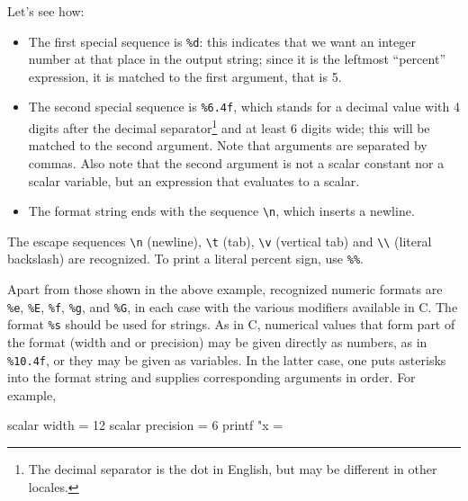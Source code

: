 Let's see how:
\begin{itemize}
\item The first special sequence is \verb|%d|: this indicates that we
  want an integer number at that place in the output string; since it
  is the leftmost ``percent'' expression, it is matched to the first
  argument, that is 5.
\item The second special sequence is \verb|%6.4f|, which stands for a
  decimal value with 4 digits after the decimal separator\footnote{The
    decimal separator is the dot in English, but may be different in
    other locales.} and at least 6 digits wide; this will be matched
  to the second argument. Note that arguments are separated by
  commas. Also note that the second argument is not a scalar constant
  nor a scalar variable, but an expression that evaluates to a scalar.
\item The format string ends with the sequence \verb|\n|, which
  inserts a newline.
\end{itemize}

The escape sequences \verb|\n| (newline), \verb|\t| (tab), \verb|\v|
(vertical tab) and \verb|\\| (literal backslash) are recognized. To
print a literal percent sign, use \verb|%%|.

Apart from those shown in the above example, recognized numeric
formats are \verb|%e|, \verb|%E|, \verb|%f|, \verb|%g|, and \verb|%G|,
in each case with the various modifiers available in C. The format
\verb|%s| should be used for strings. As in C, numerical values that
form part of the format (width and or precision) may be given directly
as numbers, as in \verb|%10.4f|, or they may be given as variables. In
the latter case, one puts asterisks into the format string and
supplies corresponding arguments in order. For example,

\begin{code}
  scalar width = 12 
  scalar precision = 6 
  printf "x = %
\end{code}


